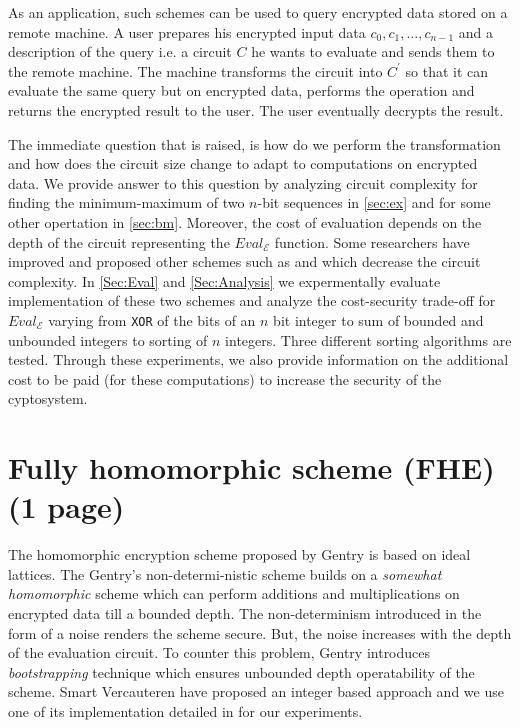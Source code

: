 \documentclass{acm_proc_article-sp}
\begin{document}
As an application, such schemes can be used to query encrypted data stored on a remote machine. A user prepares his encrypted input data $c_0, c_1, \ldots, c_{n-1}$  and a description of the query i.e. a circuit $C$ he wants to evaluate and sends them to the remote machine. The machine transforms the circuit into $C^{'}$ so that it can evaluate the same query but on encrypted data, performs the operation and returns the encrypted result to the user. The user eventually decrypts the result. 

The immediate question that is raised, is how do we perform the transformation and how does the circuit size change to adapt to computations on encrypted data. We provide answer to this question by analyzing circuit complexity for finding the minimum-maximum of two $n$-bit sequences in \autoref{sec:ex} and for some other opertation in \autoref{sec:bm}. Moreover, the cost of evaluation depends on the depth of the circuit representing the $Eval_{\mathcal{E}}$ function. Some researchers have improved and proposed other schemes such as \cite{cryptoeprint:2009:571} and \cite{cryptoeprint:2011:277} which decrease the circuit complexity. In \autoref{Sec:Eval} and \autoref{Sec:Analysis} we expermentally evaluate implementation of these two schemes and analyze the cost-security trade-off for $Eval_{\mathcal{E}}$ varying from \texttt{XOR} of the bits of an $n$ bit integer to sum of bounded and unbounded integers to sorting of $n$ integers. Three different sorting algorithms are tested.  
Through these experiments, we also provide information on the additional cost to be paid (for these computations) to increase the security of the cyptosystem.

\section{Fully homomorphic scheme (FHE) \\(1 page)}

The homomorphic encryption scheme proposed by Gentry \cite{homenc} is based on ideal lattices. The Gentry's non-determi-nistic scheme builds on a \textit{somewhat homomorphic} scheme which can perform additions and multiplications on encrypted data till a bounded depth. The non-determinism introduced in the form of a noise renders the scheme secure. But, the noise increases with the depth  of the evaluation circuit. To counter this problem, Gentry introduces \textit{bootstrapping} technique which ensures unbounded depth operatability of the scheme. Smart Vercauteren \cite{cryptoeprint:2009:571} have proposed an integer based approach and we use one of its implementation detailed in \cite{perl:poster} for our experiments.
\end{document}
